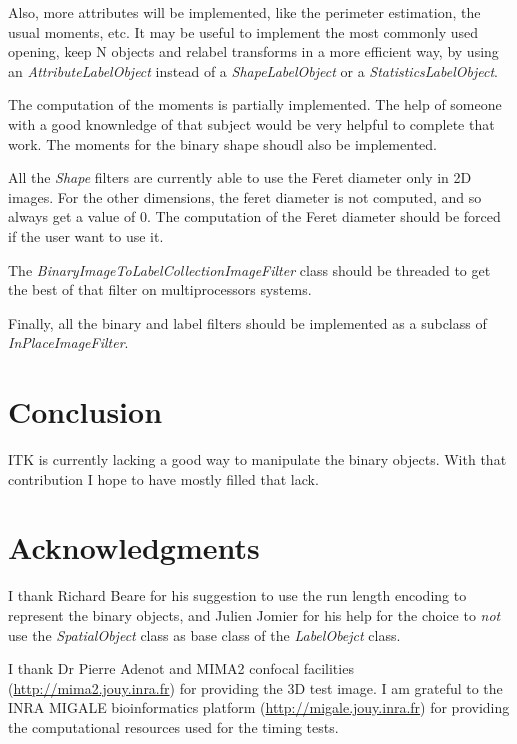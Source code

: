 \documentclass{InsightArticle}
\begin{document}
Also, more attributes will be implemented, like the perimeter estimation, the usual moments, etc. It may be useful to implement the most commonly used opening, keep N objects and relabel transforms in a more efficient way, by using an {\em AttributeLabelObject} instead of a {\em ShapeLabelObject} or a {\em StatisticsLabelObject}.

The computation of the moments is partially implemented. The help of someone with a good knownledge of that subject would be very helpful to complete that work. The moments for the binary shape shoudl also be implemented.

All the {\em Shape} filters are currently able to use the Feret diameter only in 2D images. For the other dimensions, the feret diameter is not computed, and so always get a value of $0$. The computation of the Feret diameter should be forced if the user want to use it.

The {\em BinaryImageToLabelCollectionImageFilter} class should be threaded to get the best of that filter on multiprocessors systems.

Finally, all the binary and label filters should be implemented as a subclass of {\em InPlaceImageFilter}.

\section{Conclusion}

ITK is currently lacking a good way to manipulate the binary objects. With that contribution I hope to have mostly
filled that lack.

\section{Acknowledgments}
I thank Richard Beare for his suggestion to use the run length encoding to represent the binary objects, and Julien Jomier for his help for the choice to {\em not} use the {\em SpatialObject} class as base class of the {\em LabelObejct} class.

I thank Dr Pierre Adenot and MIMA2 confocal facilities
(\url{http://mima2.jouy.inra.fr}) for providing the 3D test image.
I am grateful to the INRA MIGALE bioinformatics platform
(\url{http://migale.jouy.inra.fr}) for providing the computational resources
used for the timing tests.


\appendix





\nocite{ITKSoftwareGuide}
\end{document}

